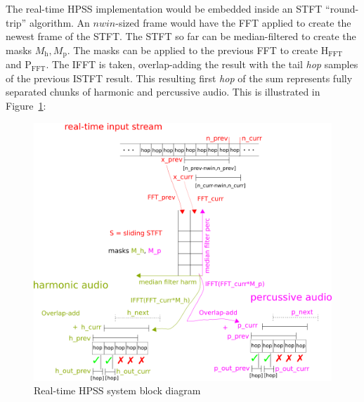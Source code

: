 \documentclass[letter,12pt]{article}
\begin{document}
The real-time HPSS implementation would be embedded inside an STFT ``round-trip'' algorithm. An $nwin$-sized frame would have the FFT applied to create the newest frame of the STFT. The STFT so far can be median-filtered to create the masks $M_{\text{h}}, M_{\text{p}}$. The masks can be applied to the previous FFT to create $\text{H}_{\text{FFT}}$ and $\text{P}_{\text{FFT}}$. The IFFT is taken, overlap-adding the result with the tail \textit{hop} samples of the previous ISTFT result. This resulting first \textit{hop} of the sum represents fully separated chunks of harmonic and percussive audio. This is illustrated in Figure~\ref{fig:rthpssdiag}:

\begin{figure}[ht]
	\centering
	\includegraphics[width=16cm]{../images/rt_hpss_diagram.png}
	\caption{Real-time HPSS system block diagram}
	\label{fig:rthpssdiag}
\end{figure}
\end{document}
